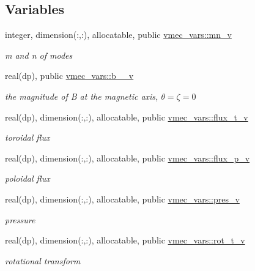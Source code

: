 \subsection*{Variables}
\begin{DoxyCompactItemize}
\item 
integer, dimension(\+:,\+:), allocatable, public \hyperlink{namespacevmec__vars_a4b9a64bc60d45f2b10e03f624ade3e82}{vmec\+\_\+vars\+::mn\+\_\+v}
\begin{DoxyCompactList}\small\item\em m and n of modes \end{DoxyCompactList}\item 
real(dp), public \hyperlink{namespacevmec__vars_a71e1a738f0e423fe6c284f8ea636008e}{vmec\+\_\+vars\+::b\+\_\+\_\+v}
\begin{DoxyCompactList}\small\item\em the magnitude of B at the magnetic axis, $\theta = \zeta = 0$ \end{DoxyCompactList}\item 
real(dp), dimension(\+:,\+:), allocatable, public \hyperlink{namespacevmec__vars_ac246a5937702b1ac4c7f9bd92d286766}{vmec\+\_\+vars\+::flux\+\_\+t\+\_\+v}
\begin{DoxyCompactList}\small\item\em toroidal flux \end{DoxyCompactList}\item 
real(dp), dimension(\+:,\+:), allocatable, public \hyperlink{namespacevmec__vars_aeac5e1262f419b7ae674586f576dc928}{vmec\+\_\+vars\+::flux\+\_\+p\+\_\+v}
\begin{DoxyCompactList}\small\item\em poloidal flux \end{DoxyCompactList}\item 
real(dp), dimension(\+:,\+:), allocatable, public \hyperlink{namespacevmec__vars_a958baf9fece8a4a001b6d8d767b48179}{vmec\+\_\+vars\+::pres\+\_\+v}
\begin{DoxyCompactList}\small\item\em pressure \end{DoxyCompactList}\item 
real(dp), dimension(\+:,\+:), allocatable, public \hyperlink{namespacevmec__vars_a676475bc7e07d96fc91c2773c8d2c84a}{vmec\+\_\+vars\+::rot\+\_\+t\+\_\+v}
\begin{DoxyCompactList}\small\item\em rotational transform \end{DoxyCompactList}\item 

\end{DoxyCompactItemize}
